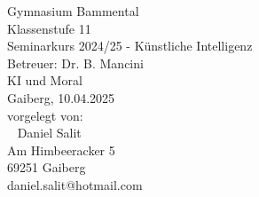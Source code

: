 \documentclass[12pt]{extarticle}
\begin{document}
    \begin{titlepage}
        \begin{center}
            \vspace{3 cm}
            \large
            Gymnasium Bammental \\
            Klassenstufe 11 \\
            Seminarkurs 2024/25 - Künstliche Intelligenz \\
            Betreuer: Dr. B. Mancini \\
            \vfill
            \HUGE KI und Moral \\
            \vspace{5 cm}
            \large
            Gaiberg, 10.04.2025 \\
            \vspace{2 cm}
            vorgelegt von: \\
            ~\newline
            Daniel Salit \\
            Am Himbeeracker 5 \\
            69251 Gaiberg \\
            daniel.salit@hotmail.com \\
        \end{center}
        \normalsize
    \end{titlepage}


    \tableofcontents

    \clearpage

    

    \clearpage
    
\end{document}
